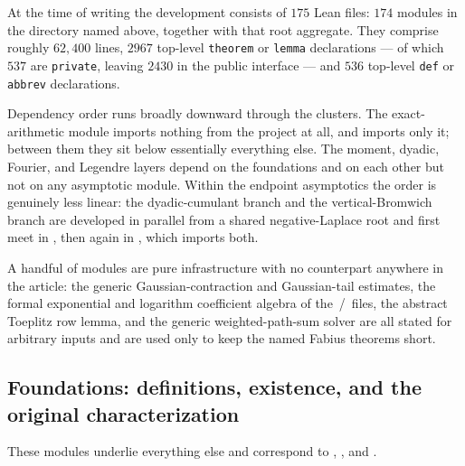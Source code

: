 \documentclass[11pt,oneside]{article}
\theoremstyle{definition}
\theoremstyle{remark}
\begin{document}
At the time of writing the development consists of $175$ Lean files: $174$ modules in the
directory named above, together with that root aggregate.  They comprise roughly $62{,}400$
lines, $2967$ top-level \texttt{theorem} or \texttt{lemma} declarations --- of which $537$
are \texttt{private}, leaving $2430$ in the public interface --- and $536$ top-level
\texttt{def} or \texttt{abbrev} declarations.

Dependency order runs broadly downward through the clusters.  The exact-arithmetic module
 imports nothing from the project at all, and 
imports only it; between them they sit below essentially everything else.  The moment,
dyadic, Fourier, and Legendre layers depend on the foundations and on each other but not on
any asymptotic module.  Within the endpoint asymptotics the order is genuinely less linear:
the dyadic-cumulant branch and the vertical-Bromwich branch are developed in parallel from a
shared negative-Laplace root and first meet in , then
again in , which imports both.

A handful of modules are pure infrastructure with no counterpart anywhere in the article:
the generic Gaussian-contraction and Gaussian-tail estimates, the formal exponential and
logarithm coefficient algebra of the \,/\, files, the
abstract Toeplitz row lemma, and the generic weighted-path-sum solver are all stated for
arbitrary inputs and are used only to keep the named Fabius theorems short.

\subsection{Foundations: definitions, existence, and the original characterization}
\label{guide:foundations}

These modules underlie everything else and correspond to ,
, and .
\end{document}
